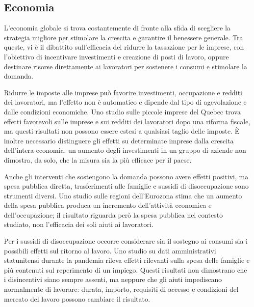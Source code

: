 \documentclass[12pt]{book} %
\begin{document}
\subsection{Economia}
L'economia globale si trova costantemente di fronte alla sfida di scegliere la strategia migliore per stimolare la crescita e garantire il benessere generale. Tra queste, vi è il dibattito sull'efficacia del ridurre la tassazione per le imprese, con l'obiettivo di incentivare investimenti e creazione di posti di lavoro, oppure destinare risorse direttamente ai lavoratori per sostenere i consumi e stimolare la domanda.

Ridurre le imposte alle imprese può favorire investimenti, occupazione e redditi dei lavoratori, ma l'effetto non è automatico e dipende dal tipo di agevolazione e dalle condizioni economiche. Uno studio sulle piccole imprese del Quebec trova effetti favorevoli sulle imprese e sui redditi dei lavoratori dopo una riforma fiscale, ma questi risultati non possono essere estesi a qualsiasi taglio delle imposte. È inoltre necessario distinguere gli effetti su determinate imprese dalla crescita dell'intera economia: un aumento degli investimenti in un gruppo di aziende non dimostra, da solo, che la misura sia la più efficace per il paese.

Anche gli interventi che sostengono la domanda possono avere effetti positivi, ma spesa pubblica diretta, trasferimenti alle famiglie e sussidi di disoccupazione sono strumenti diversi. Uno studio sulle regioni dell'Eurozona stima che un aumento della spesa pubblica produca un incremento dell'attività economica e dell'occupazione; il risultato riguarda però la spesa pubblica nel contesto studiato, non l'efficacia dei soli aiuti ai lavoratori.

Per i sussidi di disoccupazione occorre considerare sia il sostegno ai consumi sia i possibili effetti sul ritorno al lavoro. Uno studio su dati amministrativi statunitensi durante la pandemia rileva effetti rilevanti sulla spesa delle famiglie e più contenuti sul reperimento di un impiego. Questi risultati non dimostrano che i disincentivi siano sempre assenti, ma neppure che gli aiuti impediscano normalmente di lavorare: durata, importo, requisiti di accesso e condizioni del mercato del lavoro possono cambiare il risultato.
\end{document}
